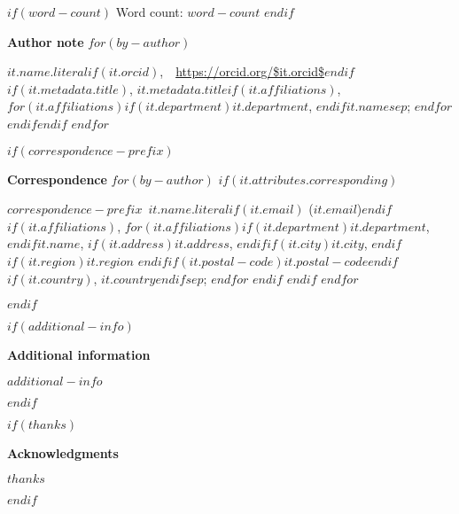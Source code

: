 
\begin{titlepage}
  \center
  {\let\newpage\relax\maketitle}
  \thispagestyle{title}
  
  \vspace{0.25in}
  
  $if(word-count)$
  {\center Word count: $word-count$}
  $endif$
  
  \vspace{0.5in}
  
  \begin{center}
    \textbf{Author note}
    $for(by-author)$
      \raggedright\setlength{\parindent}{0.5in}$it.name.literal$$if(it.orcid)$,~~\url{https://orcid.org/$it.orcid$}$endif$$if(it.metadata.title)$, $it.metadata.title$$if(it.affiliations)$, $for(it.affiliations)$$if(it.department)$$it.department$, $endif$$it.name$$sep$; $endfor$ $endif$$endif$
    $endfor$
  \end{center}
  
  $if(correspondence-prefix)$
    \begin{center}
      \textbf{Correspondence}
      $for(by-author)$
        $if(it.attributes.corresponding)$
          \par\raggedright\setlength{\parindent}{0.5in}$correspondence-prefix$~$it.name.literal$$if(it.email)$ (\href{mailto:$it.email$}{$it.email$})$endif$$if(it.affiliations)$, $for(it.affiliations)$$if(it.department)$$it.department$, $endif$$it.name$, $if(it.address)$$it.address$, $endif$$if(it.city)$$it.city$, $endif$$if(it.region)$$it.region$ $endif$$if(it.postal-code)$$it.postal-code$$endif$$if(it.country)$, $it.country$$endif$$sep$; $endfor$ $endif$
        $endif$
      $endfor$
    \end{center}
  $endif$
  
  $if(additional-info)$
    \begin{center}
      \textbf{Additional information}
      \par\raggedright\setlength{\parindent}{0.5in}$additional-info$
    \end{center}
  $endif$
  
  $if(thanks)$
    \begin{center}
      \textbf{Acknowledgments}
      \par\raggedright\setlength{\parindent}{0.5in}$thanks$
    \end{center}
  $endif$
  
  \vfill
\end{titlepage}

